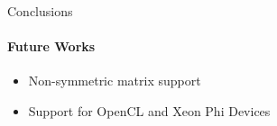 \documentclass[final]{beamer}
\newlength{\sepwid}
\newlength{\onecolwid}
\begin{document}
\begin{frame}[t]
\begin{columns}[t]
\begin{column}{\onecolwid}
\begin{block}{Conclusions}
          \paragraph{\textbf{Future Works}}
          \begin{itemize}
            \item Non-symmetric matrix support
            \item Support for OpenCL and Xeon Phi Devices
          \end{itemize}
        \end{block}
      \end{column}

      \begin{column}{\sepwid}\end{column}
    \end{columns}
  \end{frame}
\end{document}
